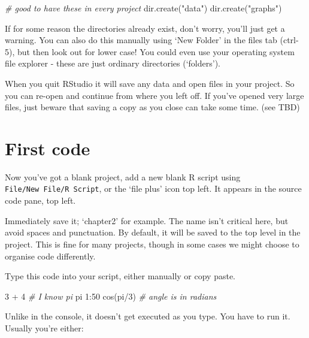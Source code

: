\documentclass[
]{book}
\newenvironment{Shaded}{\begin{snugshade}}{\end{snugshade}}
\newcommand{\CommentTok}[1]{\textcolor[rgb]{0.56,0.35,0.01}{\textit{#1}}}
\newcommand{\DecValTok}[1]{\textcolor[rgb]{0.00,0.00,0.81}{#1}}
\newcommand{\FunctionTok}[1]{\textcolor[rgb]{0.00,0.00,0.00}{#1}}
\newcommand{\NormalTok}[1]{#1}
\newcommand{\SpecialCharTok}[1]{\textcolor[rgb]{0.00,0.00,0.00}{#1}}
\newcommand{\StringTok}[1]{\textcolor[rgb]{0.31,0.60,0.02}{#1}}
\begin{document}
\begin{Shaded}
\begin{Highlighting}[]
\CommentTok{\# good to have these in every project}
\FunctionTok{dir.create}\NormalTok{(}\StringTok{"data"}\NormalTok{)}
\FunctionTok{dir.create}\NormalTok{(}\StringTok{"graphs"}\NormalTok{)}
\end{Highlighting}
\end{Shaded}

If for some reason the directories already exist, don't worry, you'll just get a warning. You can also do this manually using `New Folder' in the files tab (ctrl-5), but then look out for lower case! You could even use your operating system file explorer - these are just ordinary directories (`folders').

When you quit RStudio it will save any data and open files in your project. So you can re-open and continue from where you left off. If you've opened very large files, just beware that saving a copy as you close can take some time. (see TBD)

\hypertarget{first-code}{%
\section{First code}\label{first-code}}

Now you've got a blank project, add a new blank R script using \texttt{File/New\ File/R\ Script}, or the `file plus' icon top left. It appears in the source code pane, top left.

Immediately save it; `chapter2' for example. The name isn't critical here, but avoid spaces and punctuation. By default, it will be saved to the top level in the project. This is fine for many projects, though in some cases we might choose to organise code differently.

Type this code into your script, either manually or copy paste.

\begin{Shaded}
\begin{Highlighting}[]
\DecValTok{3} \SpecialCharTok{+} \DecValTok{4}
\CommentTok{\# I know pi}
\NormalTok{pi}
\DecValTok{1}\SpecialCharTok{:}\DecValTok{50}
\FunctionTok{cos}\NormalTok{(pi}\SpecialCharTok{/}\DecValTok{3}\NormalTok{) }\CommentTok{\# angle is in radians}
\end{Highlighting}
\end{Shaded}

Unlike in the console, it doesn't get executed as you type. You have to run it. Usually you're either:
\end{document}
